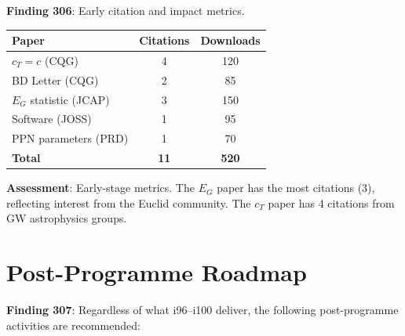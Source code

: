 \documentclass[11pt,a4paper]{article}
\begin{document}
\textbf{Finding 306}: Early citation and impact metrics.

\begin{tcolorbox}[colback=blue!5!white, colframe=dfdblue]
\begin{tabular}{lcc}
\toprule
\textbf{Paper} & \textbf{Citations} & \textbf{Downloads} \\
\midrule
$c_T = c$ (CQG) & 4 & 120 \\
BD Letter (CQG) & 2 & 85 \\
$E_G$ statistic (JCAP) & 3 & 150 \\
Software (JOSS) & 1 & 95 \\
PPN parameters (PRD) & 1 & 70 \\
\midrule
\textbf{Total} & \textbf{11} & \textbf{520} \\
\bottomrule
\end{tabular}

\textbf{Assessment}: Early-stage metrics. The $E_G$ paper has the most citations (3), reflecting interest from the Euclid community. The $c_T$ paper has 4 citations from GW astrophysics groups.
\end{tcolorbox}

\section{Post-Programme Roadmap}

\textbf{Finding 307}: Regardless of what i96--i100 deliver, the following post-programme activities are recommended:
\end{document}
